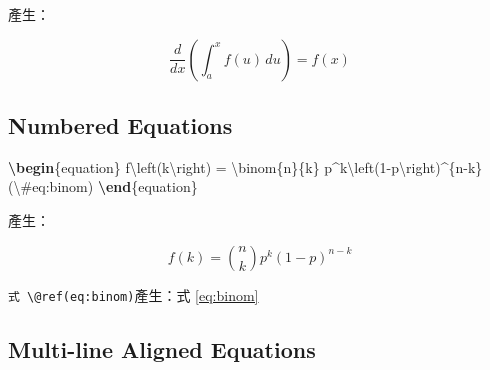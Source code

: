 \documentclass[oneside]{book}
\newenvironment{Shaded}{\begin{snugshade}}{\end{snugshade}}
\newcommand{\KeywordTok}[1]{\textcolor[rgb]{0.13,0.29,0.53}{\textbf{#1}}}
\newcommand{\SpecialCharTok}[1]{\textcolor[rgb]{0.00,0.00,0.00}{#1}}
\newcommand{\SpecialStringTok}[1]{\textcolor[rgb]{0.31,0.60,0.02}{#1}}
\newcommand{\ExtensionTok}[1]{#1}
\newcommand{\NormalTok}[1]{#1}
\theoremstyle{definition}
\theoremstyle{definition}
\theoremstyle{definition}
\theoremstyle{remark}
\begin{document}
產生：

\begin{equation*} 
\frac{d}{dx}\left( \int_{a}^{x} f(u)\,du\right)=f(x)
\end{equation*}

\subsection{Numbered Equations}\label{numbered-equations}

\begin{Shaded}
\begin{Highlighting}[]
\KeywordTok{\textbackslash{}begin}\NormalTok{\{}\ExtensionTok{equation}\NormalTok{\}}\SpecialStringTok{ }
\SpecialStringTok{  f}\SpecialCharTok{\textbackslash{}left}\SpecialStringTok{(k}\SpecialCharTok{\textbackslash{}right}\SpecialStringTok{) = }\SpecialCharTok{\textbackslash{}binom}\SpecialStringTok{\{n\}\{k\} p^k}\SpecialCharTok{\textbackslash{}left}\SpecialStringTok{(1-p}\SpecialCharTok{\textbackslash{}right}\SpecialStringTok{)^\{n-k\}}
\SpecialStringTok{  (}\SpecialCharTok{\textbackslash{}#}\SpecialStringTok{eq:binom)}
\KeywordTok{\textbackslash{}end}\NormalTok{\{}\ExtensionTok{equation}\NormalTok{\} }
\end{Highlighting}
\end{Shaded}

產生：

\begin{equation} 
  f\left(k\right) = \binom{n}{k} p^k\left(1-p\right)^{n-k}
  \label{eq:binom}
\end{equation}

\texttt{式\ \textbackslash{}@ref(eq:binom)}產生：式 \eqref{eq:binom}

\subsection{Multi-line Aligned
Equations}\label{multi-line-aligned-equations}
\end{document}
